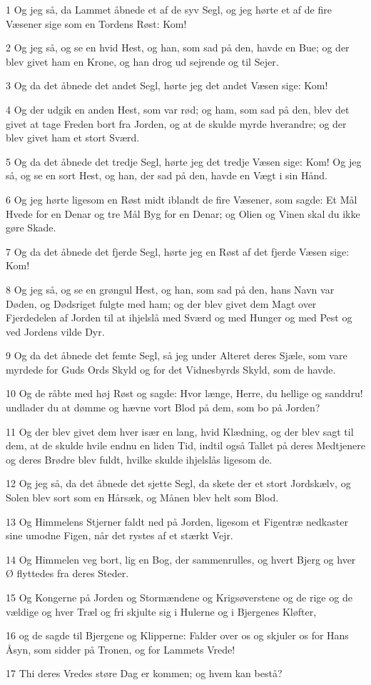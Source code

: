\par 1 Og jeg så, da Lammet åbnede et af de syv Segl, og jeg hørte et af de fire Væsener sige som en Tordens Røst: Kom!
\par 2 Og jeg så, og se en hvid Hest, og han, som sad på den, havde en Bue; og der blev givet ham en Krone, og han drog ud sejrende og til Sejer.
\par 3 Og da det åbnede det andet Segl, hørte jeg det andet Væsen sige: Kom!
\par 4 Og der udgik en anden Hest, som var rød; og ham, som sad på den, blev det givet at tage Freden bort fra Jorden, og at de skulde myrde hverandre; og der blev givet ham et stort Sværd.
\par 5 Og da det åbnede det tredje Segl, hørte jeg det tredje Væsen sige: Kom! Og jeg så, og se en sort Hest, og han, der sad på den, havde en Vægt i sin Hånd.
\par 6 Og jeg hørte ligesom en Røst midt iblandt de fire Væsener, som sagde: Et Mål Hvede for en Denar og tre Mål Byg for en Denar; og Olien og Vinen skal du ikke gøre Skade.
\par 7 Og da det åbnede det fjerde Segl, hørte jeg en Røst af det fjerde Væsen sige: Kom!
\par 8 Og jeg så, og se en grøngul Hest, og han, som sad på den, hans Navn var Døden, og Dødsriget fulgte med ham; og der blev givet dem Magt over Fjerdedelen af Jorden til at ihjelslå med Sværd og med Hunger og med Pest og ved Jordens vilde Dyr.
\par 9 Og da det åbnede det femte Segl, så jeg under Alteret deres Sjæle, som vare myrdede for Guds Ords Skyld og for det Vidnesbyrds Skyld, som de havde.
\par 10 Og de råbte med høj Røst og sagde: Hvor længe, Herre, du hellige og sanddru! undlader du at dømme og hævne vort Blod på dem, som bo på Jorden?
\par 11 Og der blev givet dem hver især en lang, hvid Klædning, og der blev sagt til dem, at de skulde hvile endnu en liden Tid, indtil også Tallet på deres Medtjenere og deres Brødre blev fuldt, hvilke skulde ihjelslås ligesom de.
\par 12 Og jeg så, da det åbnede det sjette Segl, da skete der et stort Jordskælv, og Solen blev sort som en Hårsæk, og Månen blev helt som Blod.
\par 13 Og Himmelens Stjerner faldt ned på Jorden, ligesom et Figentræ nedkaster sine umodne Figen, når det rystes af et stærkt Vejr.
\par 14 Og Himmelen veg bort, lig en Bog, der sammenrulles, og hvert Bjerg og hver Ø flyttedes fra deres Steder.
\par 15 Og Kongerne på Jorden og Stormændene og Krigsøverstene og de rige og de vældige og hver Træl og fri skjulte sig i Hulerne og i Bjergenes Kløfter,
\par 16 og de sagde til Bjergene og Klipperne: Falder over os og skjuler os for Hans Åsyn, som sidder på Tronen, og for Lammets Vrede!
\par 17 Thi deres Vredes støre Dag er kommen; og hvem kan bestå?

